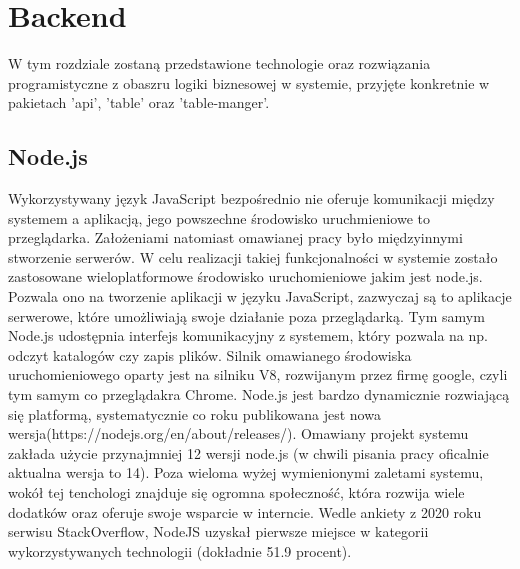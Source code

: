 \chapter{Backend}
\label{ch:funplenop}
W tym rozdziale zostaną przedstawione technologie oraz rozwiązania programistyczne z obaszru logiki biznesowej w systemie, przyjęte konkretnie w pakietach 'api', 'table' oraz 'table-manger'.

\section{Node.js}

Wykorzystywany język JavaScript bezpośrednio nie oferuje komunikacji między systemem a aplikacją, jego powszechne środowisko uruchmieniowe to przeglądarka. Założeniami natomiast omawianej pracy było międzyinnymi stworzenie serwerów. W celu realizacji takiej funkcjonalności w systemie zostało zastosowane wieloplatformowe środowisko uruchomieniowe jakim jest node.js. Pozwala ono na tworzenie aplikacji w języku JavaScript, zazwyczaj są to aplikacje serwerowe, które umożliwiają swoje działanie poza przeglądarką. Tym samym Node.js udostępnia interfejs komunikacyjny z systemem, który pozwala na np. odczyt katalogów czy  zapis plików. Silnik omawianego środowiska uruchomieniowego oparty jest na silniku V8, rozwijanym przez firmę google, czyli tym samym co przeglądakra Chrome. Node.js jest bardzo dynamicznie rozwiającą się platformą, systematycznie co roku publikowana jest nowa wersja(https://nodejs.org/en/about/releases/). Omawiany projekt systemu zakłada użycie przynajmniej 12 wersji node.js (w chwili pisania pracy oficalnie aktualna wersja to 14). Poza wieloma wyżej wymienionymi zaletami systemu, wokół tej tenchologi znajduje się ogromna społeczność, która rozwija wiele dodatków oraz oferuje swoje wsparcie w interncie. Wedle ankiety z 2020 roku serwisu StackOverflow, NodeJS uzyskał pierwsze miejsce w kategorii wykorzystywanych technologii (dokładnie 51.9 procent). 

